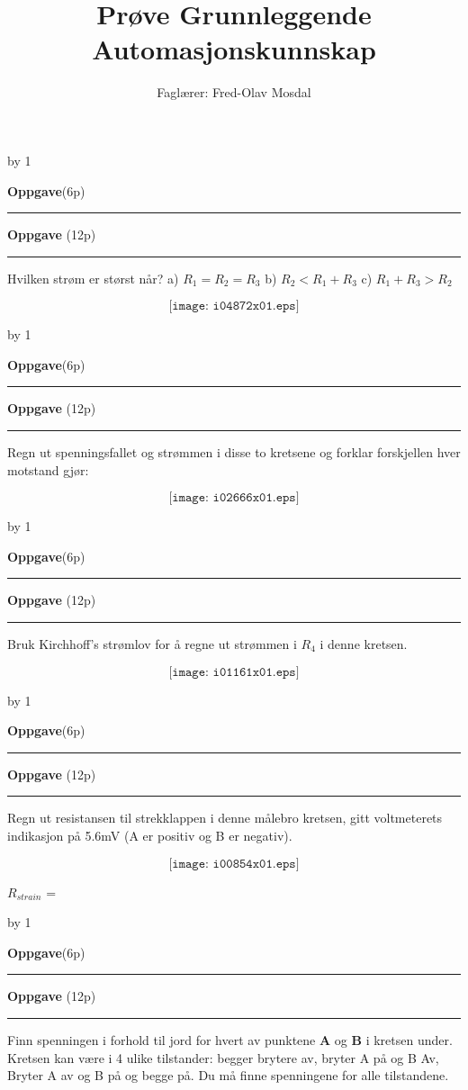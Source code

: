 \documentclass[12pt,a4paper]{article}
\def\oppgave{
            \advance\questnum by 1
	    \ifthenelse{\questnum>0\AND \questnum<9}
	    {
                \vskip 1cm
		\textbf{Oppgave}\hskip 5pt\the\questnum \hfill \hfill(6p)
		\vskip 3pt
		\hrule
	\vskip 0.5cm}
	{
                \vskip 1cm
		\textbf{Oppgave}\hskip 5pt \the\questnum \hfill \hfill(12p)
		\vskip 3pt \hrule \vskip 0.5cm }

		}
\begin{document}
\title{Prøve Grunnleggende Automasjonskunnskap}
\author{Faglærer: Fred-Olav Mosdal\\}
\maketitle
\oppgave{}%
\vskip 2.5pt 
Hvilken strøm er størst når?
\vskip 10pt
a) $R_1=R_2=R_3$
\vskip 10pt
b) $R_2<R_1 + R_3$
\vskip 10pt
c) $R_1+R_3>R_2$
\vskip 10pt

$$\texttt{[image: i04872x01.eps]}$$

\vskip 5pt 
\vskip 2.5pt 

\vskip 2.5pt 
\newpage
\oppgave{}%
\vskip 2.5pt 

Regn ut spenningsfallet og strømmen i disse to kretsene og forklar forskjellen hver motstand gjør:

$$\texttt{[image: i02666x01.eps]}$$

\vskip 2.5pt 

\vskip 2.5pt 
\newpage
\oppgave{}%
\vskip 2.5pt 
Bruk Kirchhoff's strømlov for å regne ut strømmen i $R_4$ i denne kretsen. 

$$\texttt{[image: i01161x01.eps]}$$

\vskip 2.5pt 

\vskip 2.5pt 
\newpage


\oppgave{}%
\vskip 2.5pt 

Regn ut resistansen til strekklappen i denne målebro kretsen, gitt voltmeterets indikasjon på 5.6mV (A er positiv og B er negativ).

$$\texttt{[image: i00854x01.eps]}$$

$R_{strain}$ = \underbar{\hskip 50pt}

\vskip 2.5pt 

\vskip 2.5pt 
\newpage
\oppgave{}%
\vskip 2.5pt 
Finn spenningen i forhold til jord for hvert av punktene \textbf{A} og \textbf{B} i kretsen under. 
Kretsen kan være i 4 ulike tilstander: begger brytere av, bryter A på og B Av, Bryter A av og B på og begge på. Du må finne spenningene for alle tilstandene. 
\end{document}
